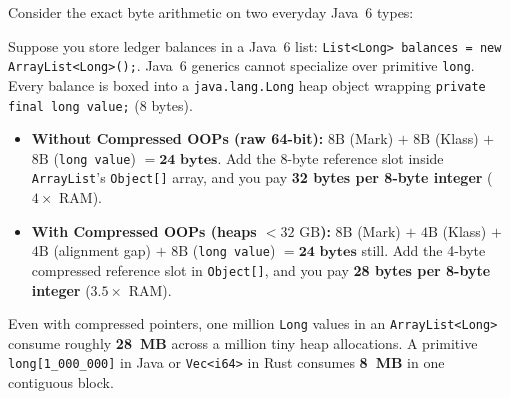 Consider the exact byte arithmetic on two everyday Java~6 types:

\begin{example}
Suppose you store ledger balances in a Java~6 list: \texttt{List<Long> balances = new ArrayList<Long>();}. Java~6 generics cannot specialize over primitive \texttt{long}. Every balance is boxed into a \texttt{java.lang.Long} heap object wrapping \texttt{private final long value;} (8 bytes).
\begin{itemize}
  \item \textbf{Without Compressed OOPs (raw 64-bit):} $8\text{B}$ (Mark) $+$ $8\text{B}$ (Klass) $+$ $8\text{B}$ (\texttt{long value}) $= \mathbf{24\text{ bytes}}$. Add the 8-byte reference slot inside \texttt{ArrayList}'s \texttt{Object[]} array, and you pay \textbf{32 bytes per 8-byte integer} ($4\times$ RAM).
  \item \textbf{With Compressed OOPs (heaps $< 32\text{ GB}$):} $8\text{B}$ (Mark) $+$ $4\text{B}$ (Klass) $+$ $4\text{B}$ (alignment gap) $+$ $8\text{B}$ (\texttt{long value}) $= \mathbf{24\text{ bytes}}$ still. Add the 4-byte compressed reference slot in \texttt{Object[]}, and you pay \textbf{28 bytes per 8-byte integer} ($3.5\times$ RAM).
\end{itemize}
Even with compressed pointers, one million \texttt{Long} values in an \texttt{ArrayList<Long>} consume roughly \textbf{28~MB} across a million tiny heap allocations. A primitive \texttt{long[1\_000\_000]} in Java or \texttt{Vec<i64>} in Rust consumes \textbf{8~MB} in one contiguous block.
\end{example}

